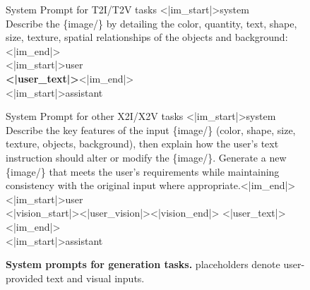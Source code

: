 \begin{figure}[t]
\centering
\begin{minipage}{\textwidth}
\centering
\small
\setlength{\parskip}{0pt}

\begin{promptfigbox}{System Prompt for T2I/T2V tasks}
{\ttfamily
\textless|im\_start|\textgreater system\\[1pt]
Describe the \{{\color{blue}image}/{\color{orange}{video}}\} by detailing the color, quantity, text, shape, size, texture, spatial relationships {} of the objects and background:\textless|im\_end|\textgreater\\[1pt]
\textless|im\_start|\textgreater user\\[1pt]
{\color{red}\bfseries \textless|user\_text|\textgreater}\textless|im\_end|\textgreater\\[1pt]
\textless|im\_start|\textgreater assistant
}
\end{promptfigbox}

\vspace{-0.3em}

\begin{promptfigbox}{System Prompt for other X2I/X2V tasks}
{\ttfamily
\textless|im\_start|\textgreater system\\[1pt]
Describe the key features of the input \{{\color{blue}image}/{\color{orange}{video}}\} (color, shape, size, texture, objects, background), then explain how the user’s text instruction should alter or modify the \{{\color{blue}image}/{\color{orange}{video}}\}. Generate a new \{{\color{blue}image}/{\color{orange}{video}}\} that meets the user’s requirements while maintaining consistency with the original input where appropriate.\textless|im\_end|\textgreater\\[1pt]
\textless|im\_start|\textgreater user\\[1pt]
\textless|vision\_start|\textgreater {{\color{red}\textless|user\_vision|\textgreater}}\textless|vision\_end|\textgreater
{{\color{red}\textless|user\_text|\textgreater}}\textless|im\_end|\textgreater\\[1pt]
\textless|im\_start|\textgreater assistant
}
\end{promptfigbox}

\vspace{-0.5em}

\end{minipage}
\caption{\textbf{System prompts for generation tasks.} {\color{red}{Red}} placeholders denote user-provided text and visual inputs.}
\label{fig:prompt-gen}
\end{figure}






